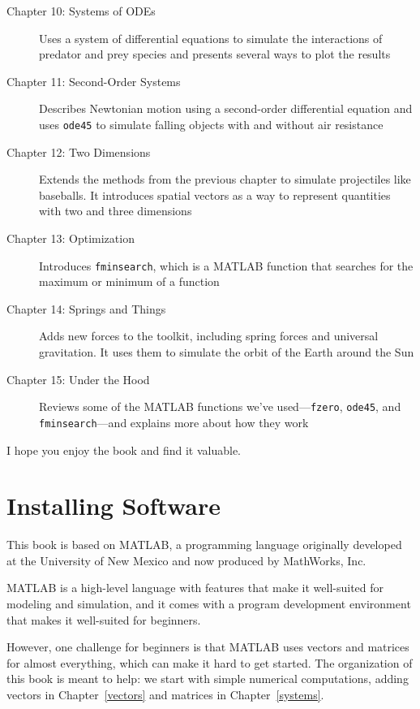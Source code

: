 \begin{description}
\item [Chapter 10: Systems of ODEs] Uses a system of differential equations to simulate the interactions of predator and prey species and presents several ways to plot the results

\item [Chapter 11: Second-Order Systems] Describes Newtonian motion using a second-order differential equation and uses \lstinline{ode45} to simulate falling objects with and without air resistance

\item [Chapter 12: Two Dimensions] Extends the methods from the previous chapter to simulate projectiles like baseballs.  It introduces spatial vectors as a way to represent quantities with two and three dimensions

\item [Chapter 13: Optimization] Introduces \lstinline{fminsearch}, which is a MATLAB function that searches for the maximum or minimum of a function

\item [Chapter 14: Springs and Things] Adds new forces to the toolkit, including spring forces and universal gravitation.  It uses them to simulate the orbit of the Earth around the Sun

\item [Chapter 15: Under the Hood] Reviews some of the MATLAB functions we've used---\lstinline{fzero}, \lstinline{ode45}, and \lstinline{fminsearch}---and explains more about how they work

\end{description}

I hope you enjoy the book and find it valuable.


\section*{Installing Software}

This book is based on MATLAB, a programming language originally \linebreak developed at the University of New Mexico and now produced by MathWorks, Inc.

MATLAB is a high-level language with features that make it well-suited for modeling and simulation, and it comes with a program development environment that makes it well-suited for beginners.

However, one challenge for beginners is that MATLAB uses vectors and matrices for almost everything, which can make it hard to get started.  The organization of this book is meant to help: we start with simple numerical computations, adding vectors in Chapter~\ref{vectors} and matrices in Chapter~\ref{systems}.

